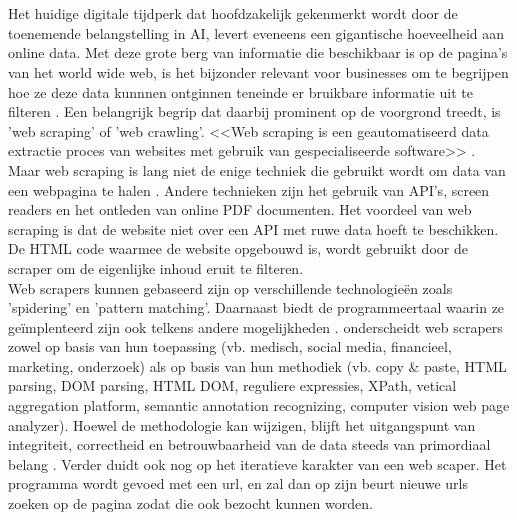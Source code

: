 \chapter{}%
\label{ch:stand-van-zaken}


Het huidige digitale tijdperk dat hoofdzakelijk gekenmerkt wordt door de toenemende belangstelling in AI, levert eveneens een gigantische hoeveelheid aan online data. Met deze grote berg van informatie die beschikbaar is op de pagina's van het world wide web, is het bijzonder relevant voor businesses om te begrijpen hoe ze deze data kunnnen ontginnen teneinde er bruikbare informatie uit te filteren \autocite{Lofti2021}. Een belangrijk begrip dat daarbij prominent op de voorgrond treedt, is 'web scraping' of 'web crawling'. <<Web scraping is een geautomatiseerd data extractie proces van websites met gebruik van gespecialiseerde software>> \textcite{Bhatt2023}. Maar web scraping is lang niet de enige techniek die gebruikt wordt om data van een webpagina te halen \autocite{Gray2012}. Andere technieken zijn het gebruik van API's, screen readers en het ontleden van online PDF documenten. Het voordeel van web scraping is dat de website niet over een API met ruwe data hoeft te beschikken. De HTML code waarmee de website opgebouwd is, wordt gebruikt door de scraper om de eigenlijke inhoud eruit te filteren.\\
Web scrapers kunnen gebaseerd zijn op verschillende technologieën zoals 'spidering' en 'pattern matching'. Daarnaast biedt de programmeertaal waarin ze geïmplenteerd zijn ook telkens andere mogelijkheden \autocite{Bhatt2023}.
\textcite{Lotfi2021} onderscheidt web scrapers zowel op basis van hun toepassing (vb. medisch, social media, financieel, marketing, onderzoek) als op basis van hun  methodiek (vb. copy \& paste, HTML parsing, DOM parsing, HTML DOM, reguliere expressies, XPath, vetical aggregation platform, semantic annotation recognizing, computer vision web page analyzer). Hoewel de methodologie kan wijzigen, blijft het uitgangspunt van integriteit, correctheid en betrouwbaarheid van de data steeds van primordiaal belang \autocite{Lofti2021}.
Verder duidt \textcite{Lofti2021} ook nog op het iteratieve karakter van een web scaper. Het programma wordt gevoed met een url, en zal dan op zijn beurt nieuwe urls zoeken op de pagina zodat die ook bezocht kunnen worden.
